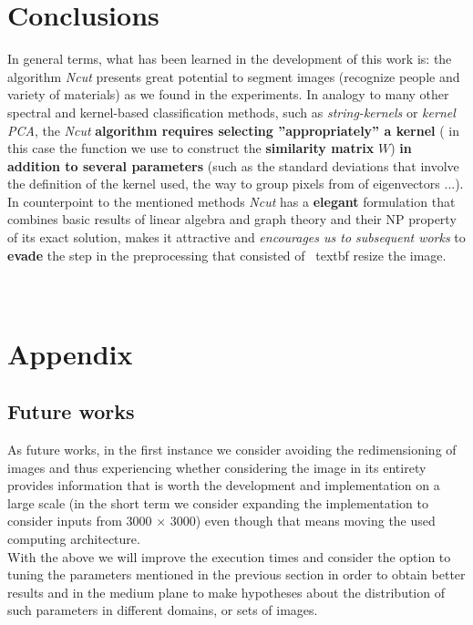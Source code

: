 \documentclass[conference]{IEEEtran}
\begin{document}
\section{Conclusions}
In general terms, what has been learned in the development of this work is: the algorithm \textit {Ncut} presents great potential to segment images (recognize people and variety of materials) as we found in the experiments. In analogy to many other spectral and kernel-based classification methods, such as \textit {string-kernels} or \textit {kernel PCA}, the \textit {Ncut} \textbf {algorithm requires selecting ''appropriately'' a kernel} ( in this case the function we use to construct the \textbf {similarity matrix} $ W $) \textbf {in addition to several parameters} (such as the standard deviations that involve the definition of the kernel used, the way to group pixels from of eigenvectors ...). In counterpoint to the mentioned methods \textit {Ncut} has a \textbf {elegant} formulation that combines basic results of linear algebra and graph theory and their NP property of its exact solution, makes it attractive and \textit {encourages us to subsequent works} to \textbf {evade} the step in the preprocessing that consisted of \ textbf {resize the image}.\\\\\\


\section*{Appendix}

\subsection*{Future works}
As future works, in the first instance we consider avoiding the redimensioning of images and thus experiencing whether considering the image in its entirety provides information that is worth the development and implementation on a large scale (in the short term we consider expanding the implementation to consider inputs from 3000 $ \times $ 3000) even though that means moving the used computing architecture. \\
With the above we will improve the execution times and consider the option to tuning the parameters mentioned in the previous section in order to obtain better results and in the medium plane to make hypotheses about the distribution of such parameters in different domains, or sets of images.
\end{document}
